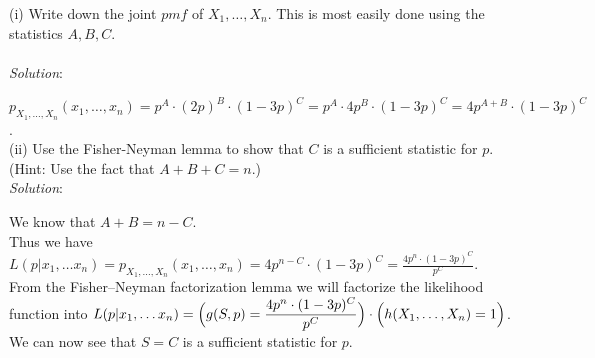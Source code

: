 \documentclass[12pt]{article}
\newcommand{\XB}{\color{black}}
\newcommand{\XV}{\color{violet}}
\begin{document}
(i) Write down the joint $ pmf $ of $ X_{1},\dots,X_{n} $. This is most easily done using the statistics $ A, B, C $. \\
\vspace{2.5mm} \\
\textit{Solution}:
\vspace{2.5mm}

\noindent
$ p_{X_{1}, \dots, X_{n}}(x_{1}, \dots, x_{n}) = p^{A} \cdot (2p)^{B} \cdot (1 - 3p)^{C} = p^{A} \cdot 4p^{B} \cdot (1 - 3p)^{C} = 4p^{A + B} \cdot (1 - 3p)^{C} $. \\



(ii) Use the Fisher-Neyman lemma to show that $ C $ is a sufficient statistic for $ p $. \\
(Hint: Use the fact that $ A + B + C = n $.)
\vspace{2.5mm} \\
\textit{Solution}:
\vspace{2.5mm}

\noindent
We know that $ A + B = n - C $. \\

\noindent
Thus we have $ \displaystyle L(p | x_{1}, \dots x_{n}) = p_{X_{1}, \dots, X_{n}}(x_{1}, \dots, x_{n}) = 4p^{n - C} \cdot (1 - 3p)^{C} = \frac{4p^{n} \cdot (1 - 3p)^C}{p^{C}} $. \\

\noindent
From the Fisher–Neyman factorization lemma we will factorize the likelihood function into $ \displaystyle L(p | x_{1}, \dots x_{n}) = \Bigl( g(S, p) = \frac{4p^{n} \cdot (1 - 3p)^C}{p^{C}} \Bigr) \cdot \Bigl( h(X_{1}, \dots , X_{n}) = 1 \Bigr) $. \\

\noindent
We can now see that $ \displaystyle S = C $ is a sufficient statistic for $ p $. \\

\end{document}

